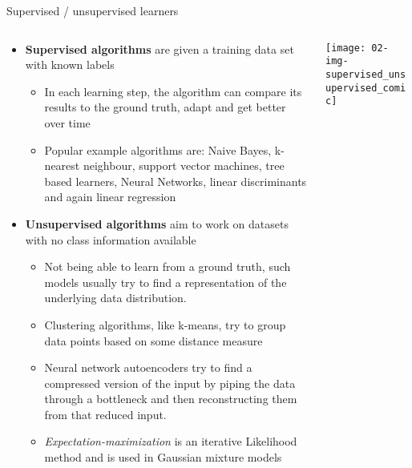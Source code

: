   \begin{frame}{Supervised / unsupervised learners}
    \begin{columns}[t]
      \begin{column}{0.65\textwidth}
        \begin{itemize}
          \item \textbf{Supervised algorithms} are given a training data set with known labels
          \begin{itemize}
            \item In each learning step, the algorithm can compare its results to the ground truth, adapt and get better over time
            \item Popular example algorithms are: Naive Bayes, k-nearest neighbour, support vector machines, tree based learners, Neural Networks, linear discriminants and again linear regression
          \end{itemize}
          \item \textbf{Unsupervised algorithms} aim to work on datasets with no class information available  %
          \begin{itemize}
            \item Not being able to learn from a ground truth, such models usually try to find a representation of the underlying data distribution.
            \item Clustering algorithms, like k-means, try to group data points based on some distance measure
            \item Neural network autoencoders try to find a compressed version of the input by piping the data through a bottleneck and then reconstructing them from that reduced input.
            \item \emph{Expectation-maximization} is an iterative Likelihood method and is used in Gaussian mixture models
          \end{itemize}
        \end{itemize}
      \end{column}
      \begin{column}{0.35\textwidth}
        \vspace*{1em}
        \texttt{[image: 02-img-supervised\_unsupervised\_comic]}
      \end{column}
    \end{columns}
  \end{frame}

